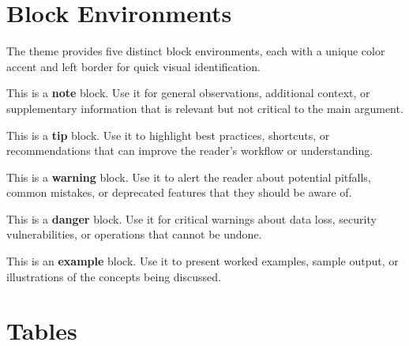 \documentclass[11pt, a4paper]{scrartcl}
\begin{document}

\section{Block Environments}

The theme provides five distinct block environments, each with a unique color
accent and left border for quick visual identification.

\begin{noteblock}
This is a \textbf{note} block. Use it for general observations, additional
context, or supplementary information that is relevant but not critical to
the main argument.
\end{noteblock}

\begin{tipblock}
This is a \textbf{tip} block. Use it to highlight best practices, shortcuts,
or recommendations that can improve the reader's workflow or understanding.
\end{tipblock}

\begin{warningblock}
This is a \textbf{warning} block. Use it to alert the reader about potential
pitfalls, common mistakes, or deprecated features that they should be aware of.
\end{warningblock}

\begin{dangerblock}
This is a \textbf{danger} block. Use it for critical warnings about data loss,
security vulnerabilities, or operations that cannot be undone.
\end{dangerblock}

\begin{exampleblock}
This is an \textbf{example} block. Use it to present worked examples, sample
output, or illustrations of the concepts being discussed.
\end{exampleblock}


\section{Tables}
\end{document}
